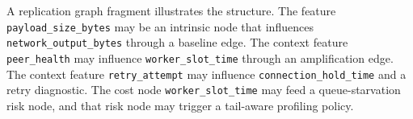 A replication graph fragment illustrates the structure. The feature
\texttt{payload\_size\_bytes} may be an intrinsic node that influences
\texttt{network\_output\_bytes} through a baseline edge. The context feature
\texttt{peer\_health} may influence \texttt{worker\_slot\_time} through an
amplification edge. The context feature \texttt{retry\_attempt} may influence
\texttt{connection\_hold\_time} and a retry diagnostic. The cost node
\texttt{worker\_slot\_time} may feed a queue-starvation risk node, and that risk
node may trigger a tail-aware profiling policy.
